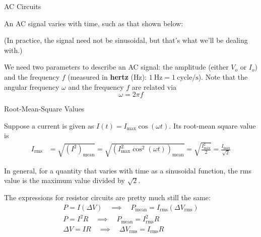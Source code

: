\documentclass{beamer}
\begin{document}
\begin{frame}{AC Circuits}

An AC signal varies with time, such as that shown below:

\begin{figure}[H]
\centering
{}
\end{figure}

\begin{center}
(In practice, the signal need not be sinusoidal, but that's what we'll be dealing with.)
\end{center}

We need two parameters to describe an AC signal: the amplitude (either $V_o$ or $I_o$) and the frequency $f$ (measured in \textbf{hertz} (Hz): $\SI{1}{\hertz} = \SI{1}{\text{cycle}\per\second}$). Note that the angular frequency $\omega$ and the frequency $f$ are related via
\begin{equation*}
    \omega = 2\pi f
\end{equation*}

\end{frame}

\begin{frame}{Root-Mean-Square Values}

Suppose a current is given as $I(t) = I_{\text{max}} \cos{(\omega t)}$. Its root-mean square value is
\begin{align*}
    I_{\text{rms}} &= \sqrt{\left( I^2 \right)_{\text{mean}}} = \sqrt{\left( I_{\text{max}}^2 \cos^2{\left(\omega t\right)}\right)_{\text{mean}}} = \sqrt{\frac{I_{\text{max}}^2}{2}} = \frac{I_{\text{max}}}{\sqrt{2}}
\end{align*}

In general, for a quantity that varies with time as a sinusoidal function, the rms value is the maximum value divided by $\sqrt{2}$.

The expressions for resistor circuits are pretty much still the same:
\begin{gather*}
    P = I \left( \Delta V \right) \quad \implies \quad P_{\text{mean}} = I_{\text{rms}} \left( \Delta V_{\text{rms}} \right) \\
    P = I^2 R \quad \implies \quad P_{\text{mean}} = I_{\text{rms}}^2 R \\
    \Delta V = I R \quad \implies \quad \Delta V_{\text{rms}} = I_{\text{rms}} R
\end{gather*}

\end{frame}
\end{document}
